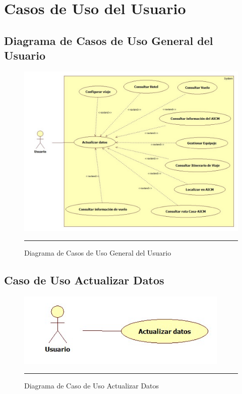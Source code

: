 \section{Casos de Uso del Usuario}

\subsection{Diagrama de Casos de Uso General del Usuario}

\begin{figure}[htbp]
	\centering
		\includegraphics[width=1\textwidth]{Figuras/cugeneralUsuario.jpg}
		\rule{30em}{0.5pt}
	\caption[Diagrama de Casos de Uso General del Usuario]{Diagrama de Casos de Uso General del Usuario}
	\label{fig:cuGeneralUsuario}
\end{figure}
\clearpage

\subsection{Caso de Uso Actualizar Datos}

\begin{figure}[htbp]
	\centering
		\includegraphics[width=0.9\textwidth]{Figuras/cuActualizarDatos.jpg}
		\rule{30em}{0.5pt}
	\caption[Diagrama de Caso de Uso Actualizar Datos]{Diagrama de Caso de Uso Actualizar Datos}
	\label{fig:cuActualizarDatos}
\end{figure}

